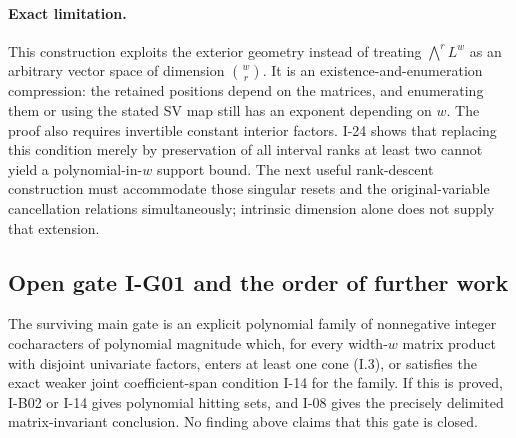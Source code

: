 \documentclass[11pt,a4paper]{article}
\theoremstyle{definition}\newtheorem{definition}{Definition}
\begin{document}
\paragraph{Exact limitation.}
This construction exploits the exterior geometry instead of
treating $\bigwedge^r L^w$ as an arbitrary vector space of
dimension $\binom wr$.  It is an existence-and-enumeration
compression: the retained positions depend on the matrices,
and enumerating them or using the stated SV map still has an
exponent depending on $w$.  The proof also requires invertible
constant interior factors.  I-24 shows that replacing this
condition merely by preservation of all interval ranks at
least two cannot yield a polynomial-in-$w$ support bound.
The next useful rank-descent construction must accommodate
those singular resets and the original-variable cancellation
relations simultaneously; intrinsic dimension alone does
not supply that extension.


\subsection{Open gate I-G01 and the order of further work}
\label{I-G01}

The surviving main gate is an explicit polynomial family of
nonnegative integer cocharacters of polynomial magnitude which, for every
width-$w$ matrix product with disjoint univariate factors,
enters at least one cone (I.3), or satisfies the exact weaker joint
coefficient-span condition I-14 for the family.  If this is
proved, I-B02 or I-14 gives polynomial hitting sets, and I-08 gives the
precisely delimited matrix-invariant conclusion.  No finding
above claims that this gate is closed.
\end{document}
